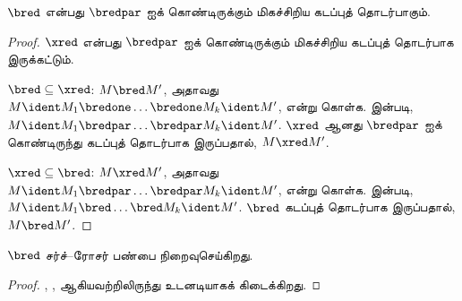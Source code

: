 \documentclass[../../../include/open-logic-section]{subfiles}
\begin{document}
\begin{lem}
  $\bred$ என்பது $\bredpar$ ஐக் கொண்டிருக்கும் மிகச்சிறிய கடப்புத் தொடர்பாகும்.
\end{lem}

\begin{proof}
  $\xred$ என்பது $\bredpar$ ஐக் கொண்டிருக்கும் மிகச்சிறிய கடப்புத் தொடர்பாக
  இருக்கட்டும்.

  $\bred \subseteq \xred$: $M \bred M'$, அதாவது $M \ident M_1
  \bredone \dots \bredone M_k \ident M'$, என்று கொள்க.
   இன்படி, $M \ident M_1 \bredpar \dots \bredpar
  M_k \ident M'$. $\xred$ ஆனது $\bredpar$ ஐக் கொண்டிருந்து கடப்புத்
  தொடர்பாக இருப்பதால், $M \xred M'$.

  $\xred \subseteq \bred$: $M \xred M'$, அதாவது $M
  \ident M_1 \bredpar \dots \bredpar M_k \ident M'$, என்று கொள்க.
   இன்படி, $M \ident M_1
  \bred \dots \bred M_k \ident M'$. $\bred$ கடப்புத் தொடர்பாக இருப்பதால்,
  $M \bred M'$.
\end{proof}

\begin{thm}
  $\bred$ சர்ச்--ரோசர் பண்பை நிறைவுசெய்கிறது.
\end{thm}

\begin{proof}
  , ,  ஆகியவற்றிலிருந்து
  உடனடியாகக் கிடைக்கிறது.
\end{proof}
\end{document}
